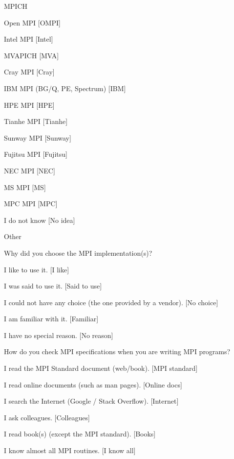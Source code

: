 \documentclass[preprint,5p,times]{elsarticle}
\begin{document}
{{\begin{description}
    \begin{inparaenum}[{\bf C}1)]
    \item MPICH
    \item Open MPI [OMPI]
    \item Intel MPI [Intel]
    \item MVAPICH [MVA]
    \item Cray MPI [Cray]
    \item IBM MPI (BG/Q, PE, Spectrum) [IBM]
    \item HPE MPI [HPE]
    \item Tianhe MPI [Tianhe]
    \item Sunway MPI [Sunway]
    \item Fujitsu MPI [Fujitsu]
    \item NEC MPI [NEC]
    \item MS MPI [MS]
    \item MPC MPI [MPC]
    \item I do not know [No idea]
    \item Other
    \end{inparaenum}
  \item[Q13:] Why did you choose the MPI implementation(s)?
    \begin{inparaenum}[{\bf C}1)]
    \item I like to use it. [I like]
    \item I was said to use it. [Said to use]
    \item I could not have any choice (the one provided by a vendor). [No choice]
    \item I am familiar with it. [Familiar]
    \item I have no special reason. [No reason]
    \end{inparaenum}
  \item[Q14*:] How do you check MPI specifications when you are writing MPI programs?
    \begin{inparaenum}[{\bf C}1)]
    \item I read the MPI Standard document (web/book). [MPI standard]
    \item I read online documents (such as man pages). [Online docs]
    \item I search the Internet (Google / Stack Overflow). [Internet]
    \item I ask colleagues. [Colleagues]
    \item I read book(s) (except the MPI standard). [Books]
    \item I know almost all MPI routines. [I know all]

\end{inparaenum}
\end{description}}}
\end{document}
